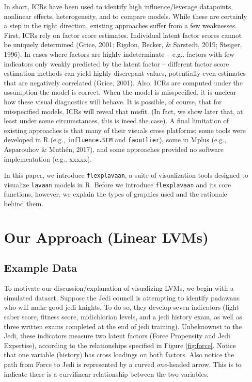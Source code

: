 \documentclass[
  english,
  doc]{apa6}
\begin{document}
In short, ICRs have been used to identify high influence/leverage datapoints, nonlinear effects, heterogeneity, and to compare models. While these are certainly a step in the right direction, existing approaches suffer from a few weaknesses. First, ICRs rely on factor score estimates. Individual latent factor scores cannot be uniquely determined (Grice, 2001; Rigdon, Becker, \& Sarstedt, 2019; Steiger, 1996). In cases where factors are highly indeterminate -- e.g., factors with few indicators only weakly predicted by the latent factor -- different factor score estimation methods can yield highly discrepant values, potentially even estimates that are negatively correlated (Grice, 2001). Also, ICRs are computed under the assumption the model is correct. When the model is misspecified, it is unclear how these visual diagnostics will behave. It is possible, of course, that for misspecified models, ICRs will reveal that misfit. (In fact, we show later that, at least under some circumstances, this is ineed the case). A final limitation of existing approaches is that many of their visuals cross platforms; some tools were developed in R (e.g., \texttt{influence.SEM} and \texttt{faoutlier}), some in Mplus (e.g., Asparouhov \& Muthén, 2017), and some approaches provided no software implementation (e.g., xxxxx).

In this paper, we introduce \texttt{flexplavaan}, a suite of visualization tools designed to visualize \texttt{lavaan} models in R. Before we introduce \texttt{flexplavaan} and its core functions, however, we explain the types of graphics used and the rationale behind them.

\hypertarget{our-approach-linear-lvms}{%
\section{Our Approach (Linear LVMs)}\label{our-approach-linear-lvms}}

\hypertarget{example-data}{%
\subsection{Example Data}\label{example-data}}

To motivate our discussion/explanation of visualizing LVMs, we begin with a simulated dataset. Suppose the Jedi council is attempting to identify padawans who will make good jedi knights. To do so, they develop seven indicators (light saber score, fitness score, midichlorian levels, and a jedi history exam, as well as three written exams completed at the end of jedi training). Unbeknownst to the Jedi, these indicators measure two latent factors (Force Propensity and Jedi Expertise), according to the relationships specified in Figure \ref{fig:force}. Notice that one variable (history) has cross loadings on both factors. Also notice the path from Force to Jedi is represented by a curved \emph{one}-headed arrow. This is to indicate there is a curvilinear relationship between the two variables.
\end{document}
